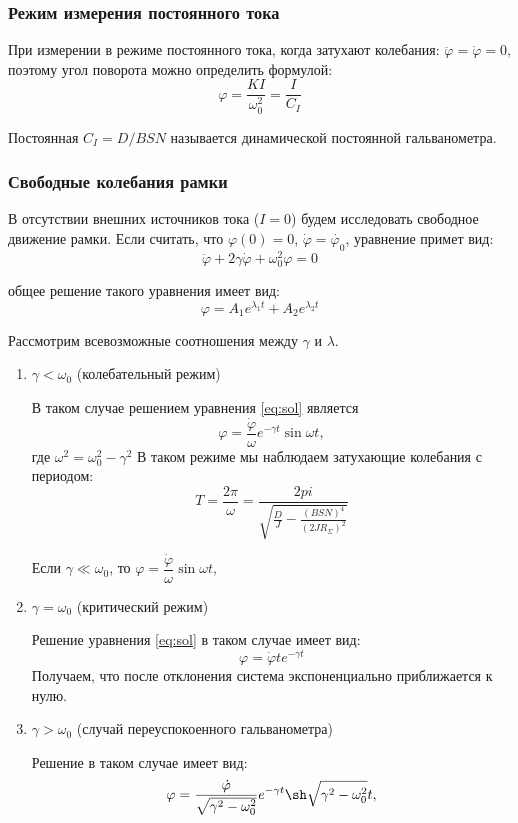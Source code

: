 \documentclass[a4paper, 12pt]{article}
\begin{document}
\subsubsection*{Режим измерения постоянного тока}
При измерении в режиме постоянного тока, когда затухают колебания: $\ddot{\varphi} = \dot{\varphi} = 0$, поэтому угол поворота можно определить формулой:
$$\varphi = \dfrac{KI}{\omega_0^2} = \dfrac{I}{C_I}$$

Постоянная $C_I = D/BSN$ называется динамической постоянной гальванометра.

\subsubsection*{Свободные колебания рамки}

В отсутствии внешних источников тока ($I = 0$) будем исследовать свободное движение рамки.
Если считать, что $\varphi(0) = 0$, $\dot{\varphi} = \dot{\varphi_0}$, уравнение примет вид:
$$\ddot{\varphi} +2 \gamma \dot{\varphi} + \omega^2_0 \varphi = 0$$

общее решение такого уравнения имеет вид:
\begin{equation}
\varphi = A_1 e^{\lambda_1t} + A_2e^{\lambda_2t}
\label{eq:sol}
\end{equation}


Рассмотрим всевозможные соотношения между $\gamma$ и $\lambda$.

\begin{enumerate}

\item $\gamma < \omega_0$ (колебательный режим)

В таком случае решением уравнения \ref{eq:sol} является 
$$ \varphi = \dfrac{\dot{\varphi}}{\omega}e^{-\gamma t} \sin \omega t,$$
где $\omega^2 = \omega^2_0 - \gamma^2$
В таком режиме мы наблюдаем затухающие колебания с периодом:
$$T = \dfrac{2\pi}{\omega} = \dfrac{2pi}{\sqrt{\frac{D}{J} - \frac{(BSN)^4}{(2JR_\Sigma)^2}}}$$

Если $\gamma \ll \omega_0$, то $ \varphi = \dfrac{\dot{\varphi}}{\omega} \sin \omega t,$

\item $\gamma = \omega_0$ (критический режим)

Решение уравнения \ref{eq:sol} в таком случае имеет вид:
$$\varphi = \dot{\varphi	}te^{-\gamma   t}$$
Получаем, что после отклонения система экспоненциально приближается к нулю.

\item $\gamma > \omega_0$ (случай переуспокоенного гальванометра)

Решение в таком случае имеет вид:
$$ \varphi = \dfrac{\dot{\varphi}}{\sqrt{\gamma^2 - \omega_0^2}}e^{-\gamma t} \sh\sqrt{\gamma^2 - \omega_0^2}  t,$$
\end{enumerate}
\end{document}
